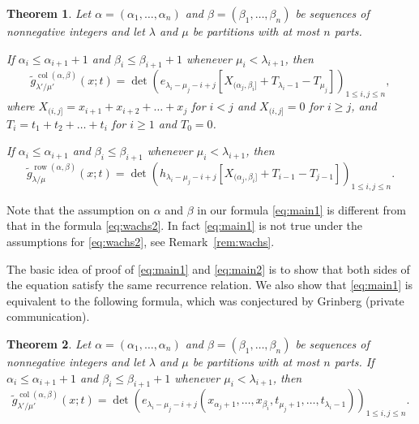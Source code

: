 \documentclass[12pt]{amsart}
\numberwithin{equation}{section}
\newtheorem{thm}{Theorem}[section]
\theoremstyle{definition}
\newcommand\wg{\widetilde{g}}
\newcommand\col{\operatorname{col}}
\newcommand\row{\operatorname{row}}
\begin{document}
\begin{thm} \label{thm:main} Let $\alpha=(\alpha_1,\dots,\alpha_n)$ and
  $\beta=(\beta_1,\dots,\beta_n)$ be sequences of nonnegative
  integers and let $\lambda$ and $\mu$ be partitions with at most $n$ parts. 

  If $\alpha_i\le \alpha_{i+1}+1$ and $\beta_i\le \beta_{i+1}+1$ whenever
  $\mu_i<\lambda_{i+1}$, then
  \begin{equation}
\label{eq:main1}
  \wg_{\lambda'/\mu'}^{\col(\alpha,\beta)}(x;t) = \det \left(
    e_{\lambda_i-\mu_j-i+j}[X_{(\alpha_j,\beta_i]}+T_{\lambda_i-1}-T_{\mu_j}]
  \right)_{1\le i,j\le n},
  \end{equation}
where $X_{(i,j]} = x_{i+1}+x_{i+2}+\dots+x_j$ for $i<j$ and $X_{(i,j]} = 0$ for
$i\ge j$, and $T_i=t_1+t_2+\dots+t_i$ for $i\ge1$ and $T_0=0$.

If $\alpha_i\le \alpha_{i+1}$ and $\beta_i\le \beta_{i+1}$ whenever
$\mu_i<\lambda_{i+1}$, then
\begin{equation}
\label{eq:main2}
\wg_{\lambda/\mu}^{\row(\alpha,\beta)}(x;t) = \det \left(
      h_{\lambda_i-\mu_j-i+j}[X_{(\alpha_j,\beta_i]}+T_{i-1}-T_{j-1}]
      \right)_{1\le i,j\le n}.
\end{equation}
\end{thm}

Note that the assumption on $\alpha$ and $\beta$ in our formula \eqref{eq:main1}
is different from that in the formula \eqref{eq:wachs2}. In fact
\eqref{eq:main1} is not true under the assumptions for \eqref{eq:wachs2}, see
Remark~\ref{rem:wachs}.

The basic idea of proof of \eqref{eq:main1} and \eqref{eq:main2} is to show that
both sides of the equation satisfy the same recurrence relation. We also show
that \eqref{eq:main1} is equivalent to the following formula, which was
conjectured by Grinberg (private communication).

\begin{thm}\label{thm:col_flag3}
  Let $\alpha=(\alpha_1,\dots,\alpha_n)$ and $\beta=(\beta_1,\dots,\beta_n)$ be
  sequences of nonnegative integers and let $\lambda$ and $\mu$ be
  partitions with at most $n$ parts. If $\alpha_i\le \alpha_{i+1}+1$ and
  $\beta_i\le \beta_{i+1}+1$ whenever $\mu_i<\lambda_{i+1}$, then
\begin{equation}
\wg_{\lambda'/\mu'}^{\col(\alpha,\beta)}(x;t)  = \det \left(
    e_{\lambda_i-\mu_j-i+j}(x_{\alpha_j+1},\dots, x_{\beta_i},t_{\mu_j+1},\dots,t_{\lambda_i-1})
  \right)_{1\le i,j\le n}.
\end{equation}
\end{thm}
\end{document}
